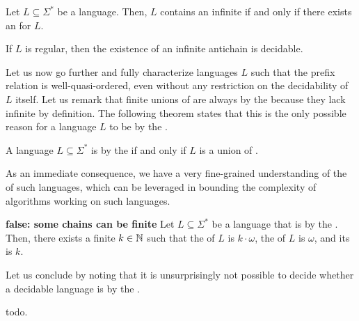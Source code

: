 \begin{lemma}
    Let $L \subseteq \Sigma^*$ be a language. Then, $L$ contains an infinite
     if and only if there exists an  for $L$.
\end{lemma}

\begin{corollary}
    If $L$ is regular, then the existence of an infinite antichain is decidable.
\end{corollary}

Let us now go further and fully characterize languages $L$ such that the
prefix relation is well-quasi-ordered, even without any restriction on the
decidability of $L$ itself. Let us remark that finite unions of  are
always  by the  because they lack
infinite  by definition. The following theorem states that this
is the only possible reason for a language $L$ to be  by
the .

\begin{theorem}
    A language $L \subseteq \Sigma^*$ is  by the
     if and only if $L$ is a union of .
\end{theorem}

As an immediate consequence, we have a very fine-grained understanding of the
 of such  languages, which can be
leveraged in bounding the complexity of algorithms working on such languages.

\begin{corollary}
    \textbf{false: some chains can be finite}
    Let $L \subseteq \Sigma^*$ be a language that is  by
    the . Then, there exists a finite $k \in \mathbb{N}$ such that
    the
     of $L$ is $k \cdot \omega$,
    the  of $L$ is $\omega$, and its
     is $k$.
\end{corollary}


Let us conclude by noting that it is unsurprisingly not possible to decide
whether a decidable language is  by the .

\begin{lemma}
    todo.
\end{lemma}
